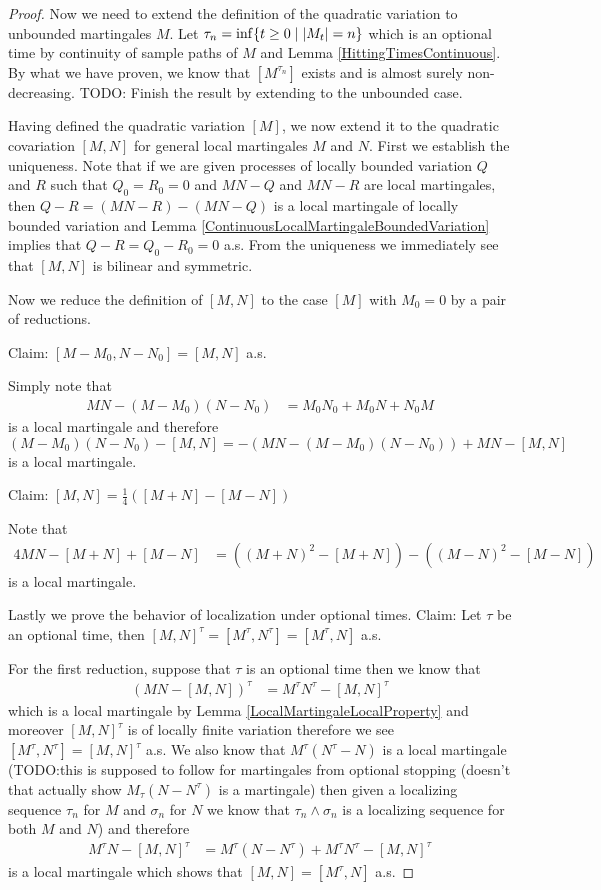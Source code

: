 \begin{proof}
Now we need to extend the definition of the quadratic variation to unbounded martingales $M$.  Let $\tau_n = \inf \lbrace t \geq 0 \mid \left \vert M_t \right \vert = n \rbrace$ which is an optional time by continuity of sample paths of $M$ and Lemma \ref{HittingTimesContinuous}.  By what we have proven, we know that $[M^{\tau_n}]$ exists and is almost surely non-decreasing.
TODO: Finish the result by extending to the unbounded case.

Having defined the quadratic variation $[M]$, we now extend it to the quadratic covariation $[M,N]$ for general local martingales $M$ and $N$.  First we establish the uniqueness.  Note that if we are given processes of locally bounded variation $Q$ and $R$ such that $Q_0 = R_0 = 0$ and $MN - Q$ and $MN - R$ are local martingales, then $Q-R = (MN -R) - (MN -Q)$ is a local martingale of locally bounded variation and Lemma \ref{ContinuousLocalMartingaleBoundedVariation} implies that $Q - R = Q_0 - R_0 = 0$ a.s.  From the uniqueness we immediately see that $[M,N]$ is bilinear and symmetric.

Now we reduce the definition of $[M,N]$ to the case $[M]$ with $M_0 = 0$ by a pair of reductions.

Claim: $[M-M_0,N-N_0] = [M,N]$ a.s.

Simply note that 
\begin{align*}
MN - (M-M_0)(N-N_0) &= M_0 N_0 + M_0 N + N_0 M
\end{align*}
is a local martingale and therefore $(M-M_0)(N-N_0) - [M,N] = -(MN - (M-M_0)(N-N_0) ) + MN - [M,N]$ is a local martingale.

Claim: $[M,N] = \frac{1}{4} ([M+N] - [M-N])$

Note that 
\begin{align*}
4 MN - [M+N] + [M-N] &= ((M+N)^2 - [M+N]) - ((M-N)^2 - [M-N])
\end{align*}
is a local martingale.

Lastly we prove the behavior of localization under optional times.
Claim: Let $\tau$ be an optional time, then $[M,N]^\tau = [M^\tau, N^\tau] = [M^\tau,N]$ a.s.

For the first reduction, suppose that $\tau$ is an optional time then we know that
\begin{align*}
(MN - [M,N])^\tau &= M^\tau N^\tau - [M,N]^\tau
\end{align*}
which is a local martingale by Lemma \ref{LocalMartingaleLocalProperty} and moreover $[M,N]^\tau$ is of locally finite variation therefore we see $[M^\tau,N^\tau] = [M,N]^\tau$ a.s.  We also know that $M^\tau (N^\tau -N)$ is a local martingale (TODO:this is supposed to follow for martingales from optional stopping (doesn't that actually show $M_\tau(N - N^\tau)$ is a martingale) then given a localizing sequence $\tau_n$ for $M$ and $\sigma_n$ for $N$ we know that $\tau_n \wedge \sigma_n$ is a localizing sequence for both $M$ and $N$) and therefore 
\begin{align*}
M^\tau N - [M,N]^\tau &= M^\tau (N - N^\tau)  + M^\tau N^\tau - [M,N]^\tau
\end{align*}
is a local martingale which shows that $[M,N]= [M^\tau,N]$ a.s.


\end{proof}
